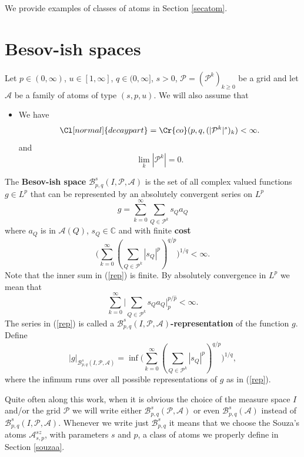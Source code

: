 \documentclass{amsart}
\theoremstyle{definition}
\newcommand{\Cll}[2][normal]{\Cl[#1]{#2}}
\newcommand{\Crr}[1]{\Cr{#1}}
\begin{document}
 
 We provide examples of classes of atoms in Section \ref{secatom}.

\section{Besov-ish spaces} 

 Let $p \in (0,\infty)$, $u \in [1,\infty]$, $q \in (0,\infty]$, $s> 0$,  $\mathcal{P}=(\mathcal{P}^k)_{k\geq 0}$ be a grid  and let $\mathcal{A}$ be a family of atoms of type $(s,p,u)$.  We will also assume that  
\begin{itemize}
\item[${\Cll[G]{sum}}.$] We have
$$\Cll{decaypart} =    \Crr{co}(p,q, (|\mathcal{P}^k|^s)_k) < \infty.$$
and
$$\lim_k |\mathcal{P}^k|=0.$$
\end{itemize}
The {\bf Besov-ish space} $\mathcal{B}^s_{p,q}(I,\mathcal{P}, \mathcal{A})$  is  the set of all complex valued functions $g \in L^p$ that  can  be represented by an absolutely convergent series on $L^p$
\begin{equation} \label{rep} g = \sum_{k=0}^{\infty} \sum_{Q \in \mathcal{P}^k}    s_Q a_Q\end{equation}
where $a_Q$ is in $\mathcal{A}(Q)$, $s_Q \in \mathbb{C}$  and with finite {\bf cost }
\begin{equation} \label{rep2} \big( \sum_{k=0}^{\infty} (\sum_{Q \in \mathcal{P}^k}    |s_Q|^p)^{q/p} \big)^{1/q} < \infty.\end{equation}
Note that the inner sum in (\ref{rep}) is finite. By absolutely convergence in $L^p$ we mean that 
$$\sum_{k=0}^{\infty} \big| \sum_{Q \in \mathcal{P}^k}    s_Q a_Q  \big|_p^{p/\hat{p}} < \infty.$$ 
The series in (\ref{rep}) is called a {\bf $\mathcal{B}^s_{p,q}(I,\mathcal{P}, \mathcal{A})$-representation} of the function $g$. 
Define
$$|g|_{\mathcal{B}^s_{p,q}(I,\mathcal{P}, \mathcal{A})} = \inf  \big( \sum_{k=0}^{\infty} (\sum_{Q \in \mathcal{P}^k}     |s_Q|^p )^{q/p} \big)^{1/q} ,$$
where the infimum runs over all possible representations of $g$ as in (\ref{rep}).  

Quite often along this work, when it is obvious the choice of the measure space $I$ and/or the grid $\mathcal{P}$  we will write either $\mathcal{B}^s_{p,q}(\mathcal{P}, \mathcal{A})$ or even $\mathcal{B}^s_{p,q}( \mathcal{A})$ instead of $\mathcal{B}^s_{p,q}(I,\mathcal{P}, \mathcal{A})$.  Whenever we write just $\mathcal{B}^s_{p,q}$ it means that we choose the Souza's atoms $\mathcal{A}^{sz}_{s,p}$, with parameters $s$ and $p$,  a class of atoms  we  properly define in Section \ref{souzaa}. 
\end{document}
